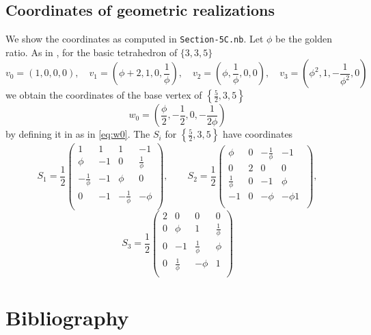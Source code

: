 \documentclass{article}
\theoremstyle{definition}
\begin{document}
\begin{appendices}
\section{Coordinates of geometric realizations}\label{sec:figs}
We show the coordinates as computed in \texttt{Section-5C.nb}. Let $\phi$ be the golden ratio. As in \cite{petcox}, for the basic tetrahedron of $\{3,3,5\}$
\[v_0=(1, 0, 0, 0),\quad v_1=\left(\phi+2,1,0,\frac{1}{\phi }\right), \quad v_2=\left(\phi,\frac{1}{\phi },0,0\right),\quad v_3=\left(\phi ^2,1,-\frac{1}{\phi ^2},0\right)\]
we obtain the coordinates of the base vertex of $\left\{\frac{5}{2},3,5\right\}$
\[w_0=\left(\frac{\phi }{2}, -\frac{1}{2}, 0, -\frac{1}{2 \phi }\right)\]
by defining it in as in \cref{eq:w0}. The $S_i$ for $\left\{\frac{5}{2},3,5\right\}$ have coordinates
\[
	S_1=\frac{1}{2}\left(
	\begin{array}{cccc}
		1 & 1 & 1 & -1 \\
		\phi  & -1 & 0 & \frac{1}{\phi } \\
		-\frac{1}{\phi } & -1 & \phi  & 0 \\
		0 & -1 & -\frac{1}{\phi } & -\phi  \\
	\end{array}	\right),
	\qquad S_2=\frac{1}{2}\left(
	\begin{array}{cccc}
		\phi  & 0 & -\frac{1}{\phi } & -1 \\
		0 & 2 & 0 & 0 \\
		\frac{1}{\phi } & 0 & -1 & \phi  \\
		-1 & 0 & -\phi  & -\phi{1}{\ } \\
	\end{array}
	\right),
\]\[
	S_3=\frac{1}{2}\left(
	\begin{array}{cccc}
		2 & 0 & 0 & 0 \\
		0 & \phi  & 1 & \frac{1}{\phi } \\
		0 & -1 & \frac{1}{\phi } & \phi  \\
		0 & \frac{1}{\phi } & -\phi  & 1 \\
	\end{array}
	\right)
\]

\end{appendices}
\section*{Bibliography}

\printbibliography[heading=none]
\end{document}
